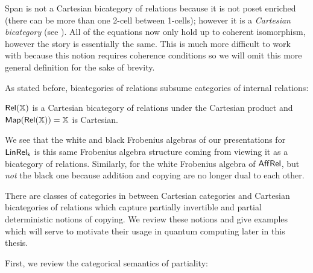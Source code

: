 Span is not a Cartesian bicategory of relations because it is not poset enriched (there can be more than one 2-cell between 1-cells); however it is a {\em Cartesian bicategory} (see \cite{carbonia}).  All of the equations now only hold up to coherent isomorphism, however the story is essentially the same. This is much more difficult to work with because this notion requires coherence conditions so we will omit this more general definition for the sake of brevity. 


As stated before, bicategories of relations subsume categories of internal relations:
\begin{example}
$\mathsf{Rel}(\mathbb{X})$ is a Cartesian bicategory of relations under the Cartesian product and ${\sf Map}(\mathsf{Rel}(\mathbb{X}))=\mathbb{X}$ is Cartesian.
\end{example}


We see that the white and black Frobenius algebras of our presentations for $\sf LinRel_k$ is this same Frobenius algebra structure coming from viewing it as a bicategory of relations.  Similarly, for the white Frobenius algebra of  $\mathsf{Aff}\mathsf{Rel}$, but {\em not} the black one because addition and copying are no longer dual to each other.




There are classes of categories in between Cartesian categories and Cartesian bicategories of relations which capture partially invertible and partial deterministic notions of copying.  We review these notions and give examples which will serve to motivate their usage in quantum computing later in this thesis.





First, we review the categorical semantics of partiality:

\label{sec:rest}


